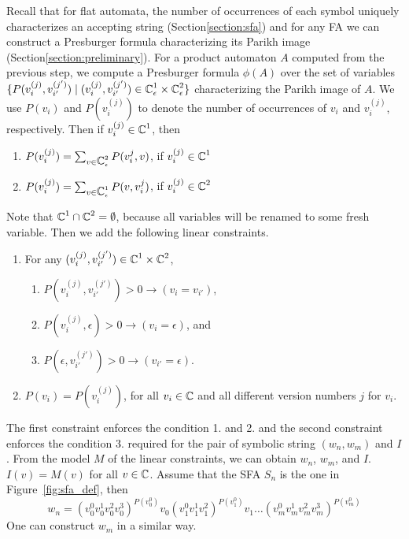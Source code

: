 \documentclass{llncs}
\begin{document}
Recall that for flat automata, the number of occurrences of each symbol uniquely characterizes an accepting string (Section\ref{section:sfa}) and for any FA we can construct a Presburger formula characterizing its Parikh image (Section\ref{section:preliminary}). For a product automaton $A$ computed from the previous step, we compute a Presburger formula $\phi(A)$ over the set of variables $\{P{(v_i^{(j)},v_{i'}^{(j')})}\mid (v_i^{(j)},v_{i'}^{(j')}) \in \mbox{$\mathbb{C}$}^1_\epsilon \times \mbox{$\mathbb{C}$}^2_\epsilon\}$ characterizing the Parikh image of $A$. We use $P(v_i)$ and $P(v_i^{(j)})$ to denote the number of occurrences of $v_i$ and $v_i^{(j)}$, respectively. Then if $v_i^{(j)} \in \mbox{$\mathbb{C}$}^1$, then 
\begin{enumerate}
	\item $P(v_i^{(j)}) = \sum_{v \in \mbox{$\mathbb{C}$}^2_\epsilon} P{(v_i^{j},v)}$, if $v_i^{(j)} \in \mbox{$\mathbb{C}$}^1$  
	\item $P(v_i^{(j)}) = \sum_{v \in \mbox{$\mathbb{C}$}^1_\epsilon} P{(v,v_i^{j})}$, if $v_i^{(j)} \in \mbox{$\mathbb{C}$}^2$ 
\end{enumerate}
Note that $\mbox{$\mathbb{C}$}^1 \cap \mbox{$\mathbb{C}$}^2 =\emptyset$, because all variables will be renamed to some fresh variable. 
Then we add the following linear constraints.

\begin{enumerate}
	\item For any $(v_i^{(j)},v_{i'}^{(j')}) \in \mbox{$\mathbb{C}$}^1 \times \mbox{$\mathbb{C}$}^2$, 
	\begin{enumerate}
		\item $P{(v_i^{(j)},v_{i'}^{(j')})}>0 \rightarrow (v_i=v_{i'})$,
		\item $P{(v_i^{(j)},\epsilon)}>0 \rightarrow (v_i=\epsilon)$, and
		\item $P{(\epsilon,v_{i'}^{(j')})}>0 \rightarrow (v_{i'}=\epsilon)$.
	\end{enumerate}
	\item $P(v_i) = P(v_i^{(j)})$, for all $v_i\in \mbox{$\mathbb{C}$}$ and all different version numbers $j$ for $v_i$.
\end{enumerate}
The first constraint enforces the condition 1. and 2. and the second constraint enforces the condition 3. required for the pair of symbolic string $(w_n, w_m)$ and $I$. From the model $M$ of the linear constraints, we can obtain $w_n$, $w_m$, and $I$. $I(v)=M(v)$ for all $v\in \mbox{$\mathbb{C}$}$. Assume that the SFA $S_n$ is the one in Figure~\ref{fig:sfa_def}, then $$w_n = (v_0^0v_0^1v_0^2v_0^3)^{P(v_0^0)}v_0(v_1^0v_1^1v_1^2)^{P(v_1^0)}v_1\ldots(v_m^0v_m^1v_m^2v_m^3)^{P(v_m^0)}$$
One can construct $w_m$ in a similar way.
\end{document}
